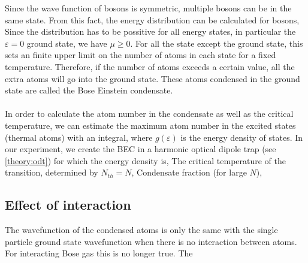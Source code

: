 Since the wave function of bosons is symmetric, multiple bosons can be in the same state. From this fact, the energy distribution can be calculated for bosons,
Since the distribution has to be possitive for all energy states, in particular the $\varepsilon=0$ ground state, we have $\mu\geqslant0$. For all the state except the ground state, this sets an finite upper limit on the number of atoms in each state for a fixed temperature. Therefore, if the number of atoms exceeds a certain value, all the extra atoms will go into the ground state. These atoms condensed in the ground state are called the Bose Einstein condensate.\\
\\
In order to calculate the atom number in the condensate as well as the critical temperature, we can estimate the maximum atom number in the excited states (thermal atoms) with an integral,
where $g(\varepsilon)$ is the energy density of states. In our experiment, we create the BEC in a harmonic optical dipole trap (see \ref{theory:odt}) for which the energy density is,
The critical temperature of the transition, determined by $N_{th}=N$,
Condensate fraction (for large $N$),

\subsection{Effect of interaction}

The wavefunction of the condensed atoms is only the same with the single particle ground state wavefunction when there is no interaction between atoms. For interacting Bose gas this is no longer true. The


